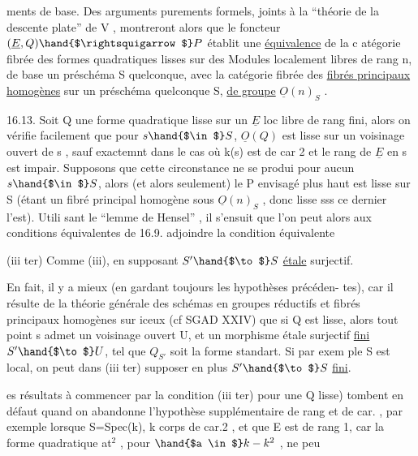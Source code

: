 
ments de base. Des arguments purements formels, joints à la
``théorie de la descente plate'' de  V  , montreront alors que le foncteur
$(\underline{E},Q) \hand{$\rightsquigarrow$} P$ établit une \uline{équivalence} de la c atégorie fibrée des formes
quadratiques lisses sur des Modules localement libres de rang n, de base
un préschéma S quelconque, avec la catégorie fibrée des \uline{fibrés principaux}
\uline{homogènes} sur un préschéma quelconque S, \uline{de groupe} $\underline{O}(n)_S$ .

16.13. Soit Q une forme quadratique lisse sur un $\underline{E}$ loc libre de
rang fini, alors on vérifie facilement que pour $s \hand{$\in$} S$, $\underline{O}(Q)$ est lisse
sur un voisinage ouvert de s ,  sauf exactemnt dans
le cas où k(s) est de car 2 et le rang de $\underline{E}$ en s est impair. Supposons
que cette circonstance ne se produi pour aucun $s \hand{$\in$} S$, alors (et alors
seulement) le P envisagé plus haut est lisse sur S (étant un fibré
principal homogène sous $\underline{O}(n)_S$ , donc lisse sss ce dernier l'est). Utili
sant le ``lemme de Hensel'' , il s'ensuit que  l'on peut alors aux
conditions équivalentes de 16.9. adjoindre la condition  équivalente

(iii ter)  Comme (iii), en supposant $S' \hand{$\to$} S$
\uline{étale} surjectif.

En fait, il y a mieux (en gardant toujours les hypothèses précéden-%
tes), car il résulte de la théorie générale des schémas en groupes réductifs
et fibrés principaux homogènes sur iceux (cf SGAD XXIV) que  si Q est
lisse, alors tout point s admet un voisinage ouvert U, et un morphisme
étale surjectif \uline{fini} $S' \hand{$\to$} U$, tel que $Q_{S'}$ soit la forme standart. Si par exem
ple S est local, on peut dans (iii ter) supposer en plus $S' \hand{$\to$} S$ \uline{fini}.

 \hand{(}es résultats  \hand{(}à commencer par la condition (iii ter) pour une Q
lisse)\hand{)} tombent en défaut quand on abandonne l'hypothèse supplémentaire
de rang et de car. , par exemple lorsque S=Spec(k), k corps  de car.2 , et
que E est de rang 1, car la forme quadratique at$^{2}$ , pour $\hand{$a \in$} k - k^{2}$ , ne peu

